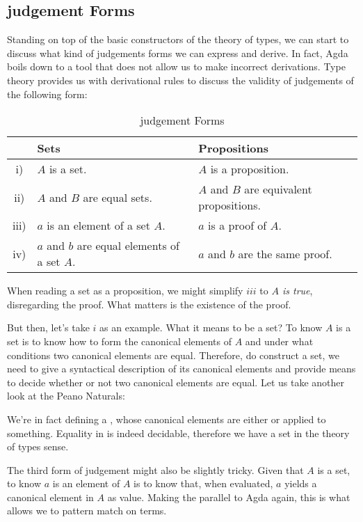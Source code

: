\subsection{judgement Forms}
Standing on top of the basic constructors of the theory of types, we can start to discuss
what kind of judgements forms we can express and derive. In fact, Agda boils down to a tool
that does not allow us to make incorrect derivations. Type theory provides us with derivational 
rules to discuss the validity of judgements of the following form:

\begin{center}
\begin{table}[h]
\begin{tabular}{c l l}
       & Sets & Propositions \\ \hline
  i)   & $A$ is a set. & $A$ is a proposition. \\
  ii)  & $A$ and $B$ are equal sets. & $A$ and $B$ are equivalent propositions. \\
  iii) & $a$ is an element of a set $A$. & $a$ is a proof of $A$. \\
  iv)  & $a$ and $b$ are equal elements of a set $A$. & $a$ and $b$ are the same proof. \\  
\end{tabular}
\caption{judgement Forms}
\end{table}
\end{center}

When reading a set as a proposition, we might simplify $iii$ to \emph{$A$ is true}, disregarding
the proof. What matters is the existence of the proof.

But then, let's take $i$ as an example. What it means to be a set? To know $A$ is a set is
to know how to form the canonical elements of $A$ and under what conditions two canonical
elements are equal. Therefore, do construct a set, we need to give a syntactical description
of its canonical elements and provide means to decide whether or not two canonical elements
are equal. Let us take another look at the Peano Naturals:


We're in fact defining a , whose canonical elements are either  or
 applied to something. Equality in  is indeed decidable, therefore we have a set
in the theory of types sense.

The third form of judgement might also be slightly tricky. Given that $A$ is a set, 
to know $a$ is an element of $A$ is to know that, when evaluated, $a$ yields a canonical element in $A$
as value. Making the parallel to Agda again, this is what allows we to pattern match on terms.

